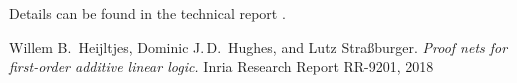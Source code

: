 \documentclass[a4paper,11pt]{article}
\begin{document}
Details can be found in the technical report \cite{HHS}.

\begin{thebibliography}{10}

Willem B.\ Heijltjes, Dominic J.\,D.\ Hughes, and Lutz Stra{\ss}burger.
\emph{Proof nets for first-order additive linear logic.}
Inria Research Report RR-9201,
2018



\end{thebibliography}


\end{document}
